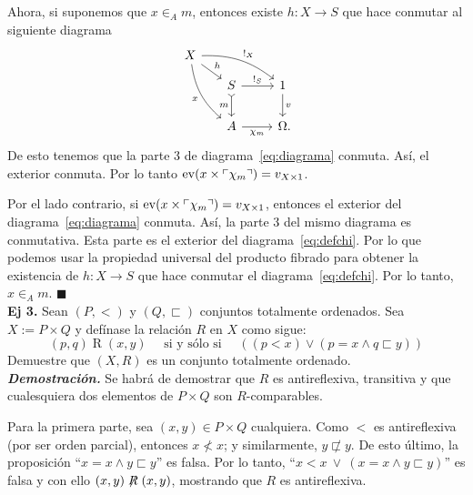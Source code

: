 \documentclass[11pt]{article}
\DeclarePairedDelimiter{\name}{\ulcorner}{\urcorner}
\newcommand{\ev}{\mathrm{ev}}
\newcommand{\QED}{\hfill\ensuremath{\blacksquare}}
\begin{document}
  Ahora, si suponemos que \(x\in_A m\), entonces existe \(h\colon X\to S\) que
  hace conmutar al siguiente diagrama
  \begin{equation}\label{eq:defchi}
    \begin{tikzcd}[ampersand replacement=\&]
      X\ar[bend left=20]{rrd}{!_X}\ar[bend right=20]{ddr}[swap]{x}
        \ar{rd}{h}\\[-2ex]
      \&[-2ex] S\ar{r}{!_S}\ar[tail]{d}[swap]{m} \& 1\ar{d}{v}\\
      \& A\ar{r}[swap]{\chi_m} \& \Omega\mathrlap{.}
    \end{tikzcd}
  \end{equation}
  De esto tenemos que la parte 3 de diagrama~\eqref{eq:diagrama} conmuta. Así, el
  exterior conmuta. Por lo tanto \(\ev(x\times\name{\chi_m})=v_{X\times 1}\).
  
  Por el lado contrario, si \(\ev(x\times\name{\chi_m})=v_{X\times 1}\),
  entonces el exterior del diagrama~\eqref{eq:diagrama} conmuta. Así, la parte 3
  del mismo diagrama es conmutativa. Esta parte es el exterior del
  diagrama~\eqref{eq:defchi}. Por lo que podemos usar la propiedad universal del
  producto fibrado para obtener la existencia de \(h\colon X\to S\) que hace
  conmutar el diagrama~\eqref{eq:defchi}. Por lo tanto, \(x\in_A m\). \QED \\

  \textbf{Ej 3.} Sean $(P,<)$ y $(Q,\sqsubset)$ conjuntos totalmente ordenados. Sea $X:=P \times Q$ y defínase la relación $R$ en $X$ como sigue:
  \[ (p,q) \mathrel{R} (x,y) \quad \text{ si y sólo si } \quad \left( \left( p < x \right) \lor \left( p=x \land q \sqsubset y \right) \right) \]
  Demuestre que $(X,R)$ es un conjunto totalmente ordenado. \\

  \textbf{\textit{Demostración.}} Se habrá de demostrar que $R$ es antireflexiva, transitiva y que cualesquiera dos elementos de $P \times Q$ son $R$-comparables.

  Para la primera parte, sea $(x,y) \in P \times Q$ cualquiera. Como $<$ es antireflexiva (por ser orden parcial), entonces $x \not< x$; y similarmente, $y \not\sqsubset y$. De esto último, la proposición ``$x=x \land y \sqsubset y$'' es falsa. Por lo tanto, ``$x<x \: \lor \: (x=x \land y \sqsubset y) $'' es falsa y con ello $(x,y) \not\mathrel{R} (x,y)$, mostrando que $R$ es antireflexiva.
\end{document}
